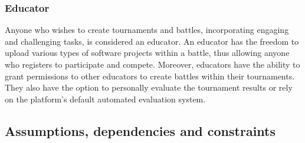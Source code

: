 \subsubsection{Educator}
Anyone who wishes to create tournaments and battles, incorporating engaging and challenging tasks, is considered an educator. An educator has the freedom to upload various types of software projects within a battle, thus allowing anyone who registers to participate and compete. Moreover, educators have the ability to grant permissions to other educators to create battles within their tournaments. They also have the option to personally evaluate the tournament results or rely on the platform's default automated evaluation system.
\subsection{Assumptions, dependencies and constraints}

